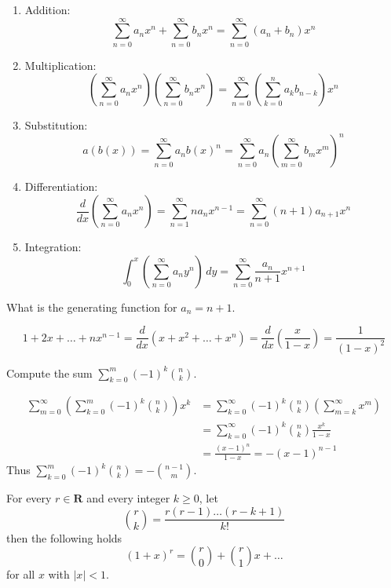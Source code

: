 \begin{enumerate}
\item Addition: 
$$
\sum_{n=0}^{\infty}a_{n}x^{n}+\sum_{n=0}^{\infty} b_{n}x^{n}=\sum_{n=0}^{\infty}(a_{n}+b_{n})x^{n}  
$$
\item Multiplication: 
$$
\left( \sum_{n=0}^{\infty} a_{n}x^{n} \right)\left( \sum_{n=0}^{\infty} b_{n}x^{n} \right)=\sum_{n=0}^{\infty} \left( \sum_{k=0}^{n} a_{k}b_{n-k} \right)x^{n}
$$
\item Substitution: 
$$
a(b(x))=\sum_{n=0}^{\infty} a_{n}b(x)^{n}=\sum_{n=0}^{\infty} a_{n}\left( \sum_{m=0}^{\infty} b_{m}x^{m} \right)^{n}
$$
\item Differentiation: 
$$
\frac{d}{dx}\left( \sum_{n=0}^{\infty} a_{n}x^{n} \right)=\sum_{n=1}^{\infty}na_{n}x^{n-1}=\sum_{n=0}^{\infty} (n+1)a_{n+1}x^{n} 
$$
\item Integration:
$$
\int_{0}^{x} \left( \sum_{n=0}^{\infty} a_{n}y^{n} \right) \, dy=\sum_{n=0}^{\infty}  \frac{a_{n}}{n+1}x^{n+1} 
$$
\end{enumerate}
\begin{example}
What is the generating function for $a_{n}=n+1$.

$$
1+2x+\dots+nx^{n-1}=\frac{d}{dx}(x+x^{2}+\dots+x^{n})=\frac{d}{dx}\left( \frac{x}{1-x} \right)=\frac{1}{(1-x)^{2}}
$$
\end{example}
\begin{example}
Compute the sum $\sum_{k=0}^{m}(-1)^{k}\binom{ n}  {k }$.

\begin{align*}
\sum_{m=0}^{\infty} \left( \sum_{k=0}^{m} (-1)^{k}\binom{ n}  {k }  \right)x^{k} & =\sum_{k=0}^{\infty} (-1)^{k}\binom{ n}  {k } \left( \sum_{m=k}^{\infty} x^{m} \right) \\
 & =\sum_{k=0}^{\infty} (-1)^{k}\binom{ n}  {k } \frac{x^{k}}{1-x} \\
 & = \frac{(x-1)^{n}}{1-x}=-(x-1)^{n-1}
\end{align*}
Thus $\sum_{k=0}^{m}(-1)^{k}\binom{ n}  {k }=-\binom{ n-1}  {m }$.
\end{example}

\begin{theorem}
For every $r\in \mathbf{R}$ and every integer $k\ge 0$, let
$$
\binom{ r}  {k } = \frac{r(r-1)\dots(r-k+1)}{k!}
$$
then the following holds 
$$
(1+x)^{r}=\binom{ r}  {0 } +\binom{ r}  {1 } x+\dots
$$
for all $x$ with $|x|<1$.
\end{theorem}